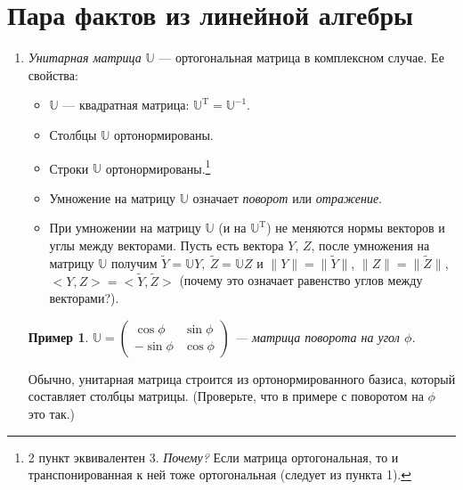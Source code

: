 \documentclass[specialist, 12pt,
subf, %
href, colorlinks=true,
substylefile = spbu.rtx,
]{disser}
\newtheorem{example}{Пример}
\begin{document}
\section{Пара фактов из линейной алгебры}
\begin{enumerate}
	\item \textit{Унитарная матрица} $\mathbb{U}$ --- ортогональная матрица в комплексном случае. Ее свойства:
	\begin{itemize}
		\item $\mathbb{U}$ --- квадратная матрица: $\mathbb{U}^{\mathrm{T}} =\mathbb{U}^{-1}$.
		\item Столбцы $\mathbb{U}$ ортонормированы.
		\item Строки $\mathbb{U}$ ортонормированы.\footnote{2 пункт эквивалентен 3. \textit{Почему?} Если матрица ортогональная, то и транспонированная к ней тоже ортогональная (следует из пункта 1).}
\item Умножение на матрицу $\mathbb{U}$ означает \textit{поворот} или \textit{отражение}.
\item При умножении на матрицу $\mathbb{U}$ (и на $\mathbb{U}^\mathrm{T}$) не меняются нормы векторов и углы между векторами. Пусть есть вектора $Y$, $Z$, после умножения на матрицу $\mathbb{U}$ получим $\widetilde{Y} = \mathbb{U}Y,~ \widetilde{Z}=\mathbb{U}Z$ и $\|Y\| = \|\widetilde{Y}\|$, $\|Z\| = \|\widetilde{Z}\|$, $<Y,Z> = <\widetilde{Y}, \widetilde{Z}>$ (почему это означает равенство углов
    между векторами?).
	\end{itemize}


\begin{example}
	 $\mathbb{U} = \begin{pmatrix}
	\cos \phi & \sin \phi\\
	-\sin \phi & \cos \phi
	\end{pmatrix}$ --- матрица поворота на угол $\phi$.
\end{example}

Обычно, унитарная матрица строится из ортонормированного базиса, который составляет столбцы
матрицы. (Проверьте, что в примере с поворотом на $\phi$ это так.)


\end{enumerate}
\end{document}
